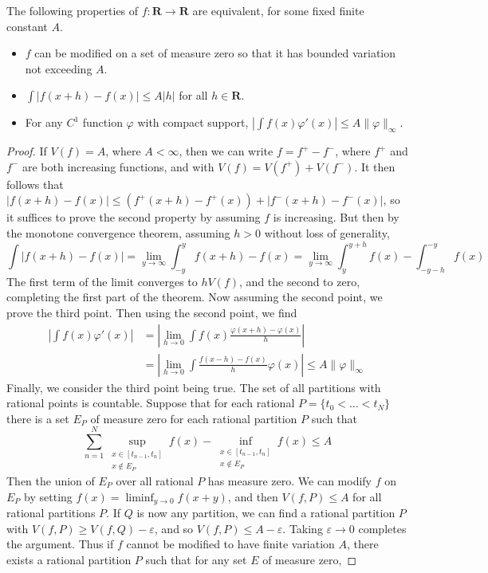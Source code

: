 \begin{theorem}
  The following properties of $f: \mathbf{R} \to \mathbf{R}$ are equivalent, for some fixed finite constant $A$.
  \begin{itemize}
    \item $f$ can be modified on a set of measure zero so that it has bounded variation not exceeding $A$.
    \item $\int |f(x+h) - f(x)| \leq A|h|$ for all $h \in \mathbf{R}$.
    \item For any $C^1$ function $\varphi$ with compact support, $\left| \int f(x) \varphi'(x) \right| \leq A \| \varphi \|_\infty$.
  \end{itemize}
\end{theorem}
\begin{proof}
  If $V(f) = A$, where $A < \infty$, then we can write $f = f^+ - f^-$, where $f^+$ and $f^-$ are both increasing functions, and with $V(f) = V(f^+) + V(f^-)$. It then follows that $|f(x+h) - f(x)| \leq (f^+(x+h) - f^+(x)) + |f^-(x+h) - f^-(x)|$, so it suffices to prove the second property by assuming $f$ is increasing. But then by the monotone convergence theorem, assuming $h > 0$ without loss of generality,
  \[ \int |f(x+h) - f(x)| = \lim_{y \to \infty} \int_{-y}^y f(x+h) - f(x) = \lim_{y \to \infty} \int_y^{y+h} f(x) - \int_{-y-h}^{-y} f(x) \]
  The first term of the limit converges to $hV(f)$, and the second to zero, completing the first part of the theorem. Now assuming the second point, we prove the third point. Then using the second point, we find
  \begin{align*}
    \left|\int f(x) \varphi'(x) \right| &= \left| \lim_{h \to 0} \int f(x) \frac{\varphi(x+h) - \varphi(x)}{h} \right|\\
    &= \left| \lim_{h \to 0} \int \frac{f(x-h) - f(x)}{h} \varphi(x) \right| \leq A \| \varphi \|_\infty
  \end{align*}
  Finally, we consider the third point being true. The set of all partitions with rational points is countable. Suppose that for each rational $P = \{ t_0 < \dots < t_N \}$ there is a set $E_P$ of measure zero for each rational partition $P$ such that
  \[ \sum_{n = 1}^N \sup_{\substack{x \in [t_{n-1},t_n]\\x \not \in E_P}} f(x) - \inf_{\substack{x \in [t_{n-1},t_n]\\x \not \in E_P}} f(x) \leq A \]
  Then the union of $E_P$ over all rational $P$ has measure zero. We can modify $f$ on $E_P$ by setting $f(x) = \liminf_{y \to 0} f(x+y)$, and then $V(f,P) \leq A$ for all rational partitions $P$. If $Q$ is now any partition, we can find a rational partition $P$ with $V(f,P) \geq V(f,Q) - \varepsilon$, and so $V(f,P) \leq A - \varepsilon$. Taking $\varepsilon \to 0$ completes the argument. Thus if $f$ cannot be modified to have finite variation $A$, there exists a rational partition $P$ such that for any set $E$ of measure zero,

\end{proof}
